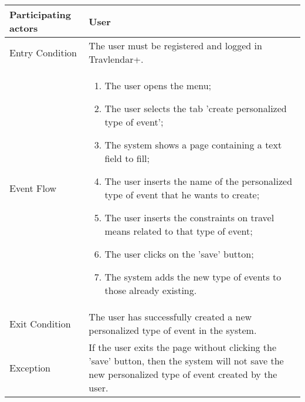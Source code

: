 \begin{table}[H]
	\begin{center}
		\begin{tabular}{ | p{} | p{} | }
		\hline
		Participating actors & User\\
		\hline
		Entry Condition & The user must be registered and logged in Travlendar+.\\
		\hline
		Event Flow & 
			\begin{enumerate}
				\item The user opens the menu;
				\item The user selects the tab 'create personalized type of event';
				\item The system shows a page containing a text field to fill;
				\item The user inserts the name of the personalized type of event that he wants to create;
				\item The user inserts the constraints on travel means related to that type of event;
				\item The user clicks on the 'save' button;
				\item The system adds the new type of events to those already existing.

			\end{enumerate} \\
		\hline
		Exit Condition & The user has successfully created a new personalized type of event in the system.\\
		\hline
		Exception & If the user exits the page without clicking the 'save' button, then the system will not save the new personalized type of event created by the user.\\ 
		\hline
		\end{tabular}
	\end{center}
\end{table}